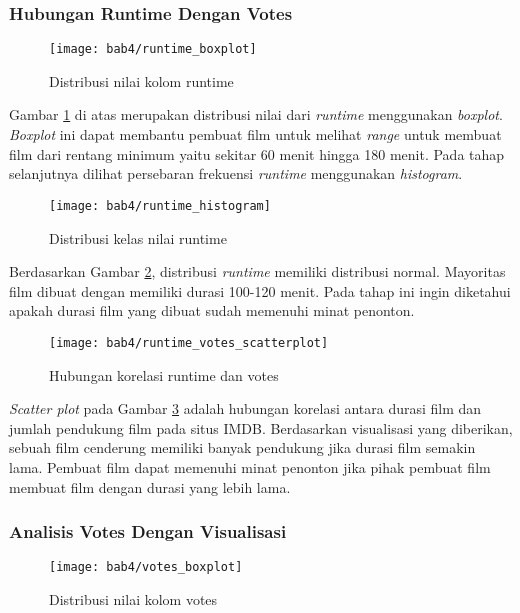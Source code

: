 \subsubsection{Hubungan Runtime Dengan Votes}
\begin{figure}[H]
	\centering  
	\texttt{[image: bab4/runtime\_boxplot]}   
	\caption{Distribusi nilai kolom runtime}
	\label{fig:runtime_boxplot} 
\end{figure} 

Gambar \ref{fig:runtime_boxplot} di atas merupakan distribusi nilai dari \textit{runtime} menggunakan \textit{boxplot}. \textit{Boxplot}  ini dapat membantu pembuat film untuk melihat \textit{range} untuk membuat film dari rentang minimum yaitu sekitar 60 menit hingga 180 menit. Pada tahap selanjutnya dilihat persebaran frekuensi \textit{runtime} menggunakan \textit{histogram}.

\begin{figure}[H]
	\centering  
	\texttt{[image: bab4/runtime\_histogram]}   
	\caption{Distribusi kelas nilai runtime}
	\label{fig:runtime_histogram} 
\end{figure} 

Berdasarkan Gambar \ref{fig:runtime_histogram}, distribusi \textit{runtime} memiliki distribusi normal. Mayoritas film dibuat dengan memiliki durasi 100-120 menit. Pada tahap ini ingin diketahui apakah durasi film yang dibuat sudah memenuhi minat penonton. 

\begin{figure}[H]
	\centering  
	\texttt{[image: bab4/runtime\_votes\_scatterplot]}   
	\caption{Hubungan korelasi runtime dan votes}
	\label{fig:runtime_votes_scatterplot} 
\end{figure} 

\textit{Scatter plot} pada Gambar \ref{fig:runtime_votes_scatterplot} adalah hubungan korelasi antara durasi film dan jumlah pendukung film pada situs IMDB. Berdasarkan visualisasi yang diberikan, sebuah film cenderung memiliki banyak pendukung jika durasi film semakin lama. Pembuat film dapat memenuhi minat penonton jika pihak pembuat film membuat film dengan durasi yang lebih lama.


\subsubsection{Analisis Votes Dengan Visualisasi}
\begin{figure}[H]
	\centering  
	\texttt{[image: bab4/votes\_boxplot]}   
	\caption{Distribusi nilai kolom votes}
	\label{fig:votes_boxplot} 
\end{figure} 

